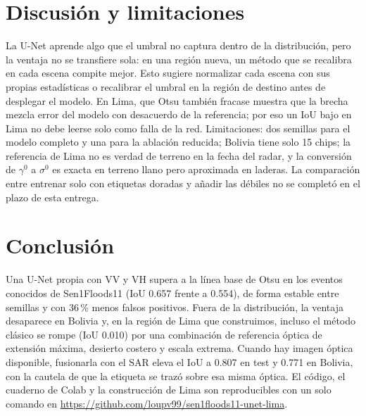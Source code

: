 \documentclass{article}
\begin{document}
\section{Discusión y limitaciones}
La U-Net aprende algo que el umbral no captura dentro de la distribución, pero la ventaja no se transfiere sola: en una región nueva, un método que se recalibra en cada escena compite mejor. Esto sugiere normalizar cada escena con sus propias estadísticas o recalibrar el umbral en la región de destino antes de desplegar el modelo. En Lima, que Otsu también fracase muestra que la brecha mezcla error del modelo con desacuerdo de la referencia; por eso un IoU bajo en Lima no debe leerse solo como falla de la red.
Limitaciones: dos semillas para el modelo completo y una para la ablación reducida; Bolivia tiene solo 15 chips; la referencia de Lima no es verdad de terreno en la fecha del radar, y la conversión de $\gamma^0$ a $\sigma^0$ es exacta en terreno llano pero aproximada en laderas. La comparación entre entrenar solo con etiquetas doradas y añadir las débiles no se completó en el plazo de esta entrega.

\section{Conclusión}
Una U-Net propia con VV y VH supera a la línea base de Otsu en los eventos conocidos de Sen1Floods11 (IoU 0.657 frente a 0.554), de forma estable entre semillas y con 36\,\% menos falsos positivos. Fuera de la distribución, la ventaja desaparece en Bolivia y, en la región de Lima que construimos, incluso el método clásico se rompe (IoU 0.010) por una combinación de referencia óptica de extensión máxima, desierto costero y escala extrema. Cuando hay imagen óptica disponible, fusionarla con el SAR eleva el IoU a 0.807 en test y 0.771 en Bolivia, con la cautela de que la etiqueta se trazó sobre esa misma óptica. El código, el cuaderno de Colab y la construcción de Lima son reproducibles con un solo comando en \url{https://github.com/loupv99/sen1floods11-unet-lima}.
\end{document}
